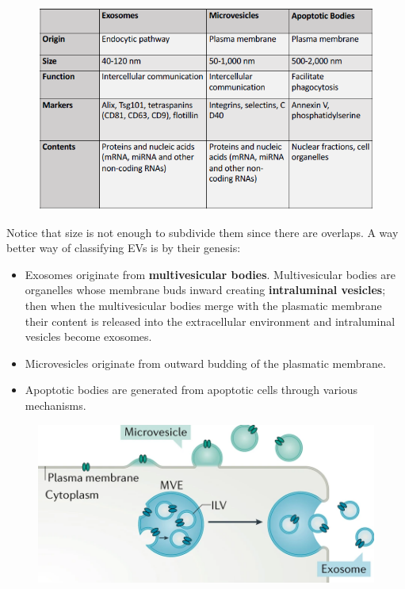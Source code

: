   \begin{figure}[H]
  \includegraphics[scale=0.8]{image_05.png}
  \end{figure}

  Notice that size is not enough to subdivide them since there are overlaps. A way better way of classifying EVs is by their genesis:
  \begin{itemize}
    \item Exosomes originate from \textbf{multivesicular bodies}. Multivesicular bodies are organelles whose membrane buds inward creating \textbf{intraluminal vesicles}; then when the multivesicular bodies merge with the plasmatic membrane their content is released into the extracellular environment and intraluminal vesicles become exosomes.
    \item Microvesicles originate from outward budding of the plasmatic membrane.
    \item Apoptotic bodies are generated from apoptotic cells through various mechanisms.
  \end{itemize}

  \begin{figure}[H]
  \includegraphics[scale=0.5]{image_06.png}
  \end{figure}

